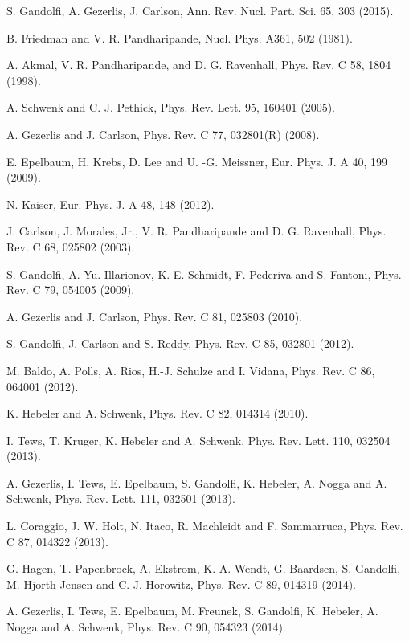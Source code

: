 \documentclass[aps,11pt,prc,preprint,superscriptaddress,nofootinbib]{revtex4}
\begin{document}
\begin{thebibliography}{99}
 S. Gandolfi, A. Gezerlis, J. Carlson, Ann. Rev. Nucl. Part.
Sci. 65, 303 (2015).

 B. Friedman and V. R. Pandharipande, Nucl. Phys. A361, 502
(1981).%

 A. Akmal, V. R. Pandharipande, and D. G. Ravenhall, Phys.
Rev. C 58, 1804 (1998).

 A. Schwenk and C. J. Pethick, Phys. Rev. Lett. 95, 160401
(2005).

 A. Gezerlis and J. Carlson, Phys. Rev. C 77, 032801(R) (2008).

 E. Epelbaum, H. Krebs, D. Lee and U. -G. Meissner,
Eur. Phys. J. A 40, 199 (2009).

 N. Kaiser, Eur. Phys. J. A 48, 148 (2012).

 J. Carlson, J. Morales, Jr., V. R. Pandharipande and D. G.
Ravenhall, Phys. Rev. C 68, 025802 (2003).

 S. Gandolfi, A. Yu. Illarionov, K. E. Schmidt, F. Pederiva
and S. Fantoni, Phys. Rev. C 79, 054005 (2009).

 A. Gezerlis and J. Carlson, Phys. Rev. C 81, 025803 (2010).

 S. Gandolfi, J. Carlson and S. Reddy, Phys. Rev. C 85,
032801 (2012).

 M. Baldo, A. Polls, A. Rios, H.-J. Schulze and I. Vidana,
Phys. Rev. C 86, 064001 (2012).

 K. Hebeler and A. Schwenk, Phys. Rev. C 82, 014314 (2010).

 I. Tews, T. Kruger, K. Hebeler and A. Schwenk, Phys. Rev.
Lett. 110, 032504 (2013).

 A. Gezerlis, I. Tews, E. Epelbaum, S. Gandolfi, K. Hebeler,
A. Nogga and A. Schwenk, Phys. Rev. Lett. 111, 032501 (2013).

 L. Coraggio, J. W. Holt, N. Itaco, R. Machleidt and F.
Sammarruca, Phys. Rev. C 87, 014322 (2013).

 G. Hagen, T. Papenbrock, A. Ekstrom, K. A. Wendt, G.
Baardsen, S. Gandolfi, M. Hjorth-Jensen and C. J. Horowitz, Phys. Rev. C
89, 014319 (2014).

 A. Gezerlis, I. Tews, E. Epelbaum, M. Freunek, S. Gandolfi,
K. Hebeler, A. Nogga and A. Schwenk, Phys. Rev. C 90, 054323 (2014).


\end{thebibliography}
\end{document}
